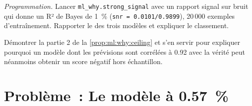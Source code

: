 \begin{exercise}[$\star\star\star$]\label{exo:ml:why-financial-machine-learning-is-different:7}
\emph{Programmation.} Lancer \texttt{ml\_why.strong\_signal} avec un rapport signal sur bruit qui donne un R² de Bayes de 1~\%
(\texttt{snr = 0.0101/0.9899}), 20\,000 exemples d'entraînement. Rapporter le  des trois modèles et expliquer
le classement.
\end{exercise}

\begin{exercise}[$\star\star\star$]\label{exo:ml:why-financial-machine-learning-is-different:8}
Démontrer la partie 2 de la \cref{prop:ml:why:ceiling} et s'en servir pour expliquer pourquoi un modèle dont les prévisions sont corrélées à 0.92 avec
la vérité peut néanmoins obtenir un score négatif hors échantillon.
\end{exercise}

\section{Problème~: Le modèle à 0.57~\%}

